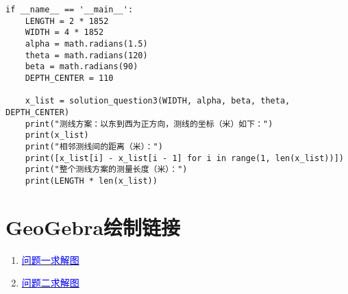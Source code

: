 \begin{lstlisting}[caption={question3.py}]
if __name__ == '__main__':
    LENGTH = 2 * 1852
    WIDTH = 4 * 1852
    alpha = math.radians(1.5)
    theta = math.radians(120)
    beta = math.radians(90)
    DEPTH_CENTER = 110

    x_list = solution_question3(WIDTH, alpha, beta, theta, DEPTH_CENTER)
    print("测线方案：以东到西为正方向，测线的坐标（米）如下：")
    print(x_list)
    print("相邻测线间的距离（米）：")
    print([x_list[i] - x_list[i - 1] for i in range(1, len(x_list))])
    print("整个测线方案的测量长度（米）：")
    print(LENGTH * len(x_list))
\end{lstlisting}

\section{GeoGebra绘制链接}

\begin{enumerate}
    \item \href{https://www.geogebra.org/m/hpkkarys}{\textcolor{blue}{问题一求解图}}
    \item \href{https://www.geogebra.org/m/f6kfjvru}{\textcolor{blue}{问题二求解图}}
\end{enumerate}
